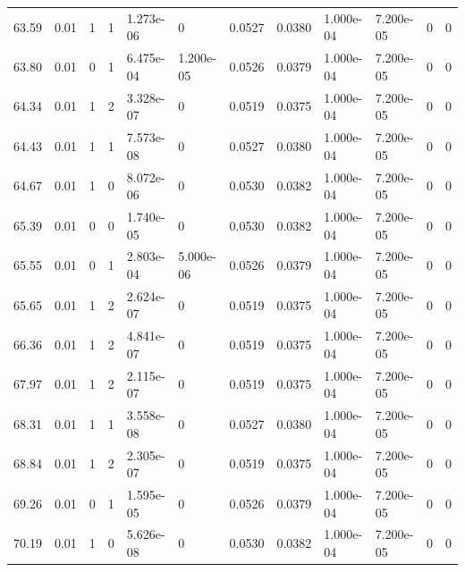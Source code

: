 \documentclass[preview]{standalone}
\begin{document}
{{{\begin{tabular}{L{1.2cm}C{1.2cm} C{0.3cm}C{0.5cm} C{1.4cm}C{1.4cm} C{1.4cm}C{1.4cm} C{1.6cm}C{1.6cm} C{1.6cm}C{1.6cm}}
  63.59  &  0.01  & 1     &  1 &  1.273e-06  & 0  &  0.0527&   0.0380& 1.000e-04 & 7.200e-05   &  0 & 0  \\ 
  63.80  &  0.01  & 0     &  1 &  6.475e-04  & 1.200e-05  &  0.0526&   0.0379& 1.000e-04 & 7.200e-05   &  0 & 0  \\ 
  64.34  &  0.01  & 1     &  2 &  3.328e-07  & 0  &  0.0519&   0.0375& 1.000e-04 & 7.200e-05   &  0 & 0  \\ 
  64.43  &  0.01  & 1     &  1 &  7.573e-08  & 0  &  0.0527&   0.0380& 1.000e-04 & 7.200e-05   &  0 & 0  \\ 
  64.67  &  0.01  & 1     &  0 &  8.072e-06  & 0  &  0.0530&   0.0382& 1.000e-04 & 7.200e-05   &  0 & 0  \\ 
  65.39  &  0.01  & 0     &  0 &  1.740e-05  & 0  &  0.0530&   0.0382& 1.000e-04 & 7.200e-05   &  0 & 0  \\ 
  65.55  &  0.01  & 0     &  1 &  2.803e-04  & 5.000e-06  &  0.0526&   0.0379& 1.000e-04 & 7.200e-05   &  0 & 0  \\ 
  65.65  &  0.01  & 1     &  2 &  2.624e-07  & 0  &  0.0519&   0.0375& 1.000e-04 & 7.200e-05   &  0 & 0  \\ 
  66.36  &  0.01  & 1     &  2 &  4.841e-07  & 0  &  0.0519&   0.0375& 1.000e-04 & 7.200e-05   &  0 & 0  \\ 
  67.97  &  0.01  & 1     &  2 &  2.115e-07  & 0  &  0.0519&   0.0375& 1.000e-04 & 7.200e-05   &  0 & 0  \\ 
  68.31  &  0.01  & 1     &  1 &  3.558e-08  & 0  &  0.0527&   0.0380& 1.000e-04 & 7.200e-05   &  0 & 0  \\ 
  68.84  &  0.01  & 1     &  2 &  2.305e-07  & 0  &  0.0519&   0.0375& 1.000e-04 & 7.200e-05   &  0 & 0  \\ 
  69.26  &  0.01  & 0     &  1 &  1.595e-05  & 0  &  0.0526&   0.0379& 1.000e-04 & 7.200e-05   &  0 & 0  \\ 
  70.19  &  0.01  & 1     &  0 &  5.626e-08  & 0  &  0.0530&   0.0382& 1.000e-04 & 7.200e-05   &  0 & 0  \\ 
\hline 
\end{tabular} 

}}}
\end{document}
